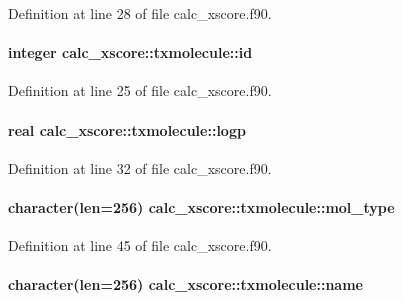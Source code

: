 Definition at line 28 of file calc\-\_\-xscore.\-f90.

\hypertarget{structcalc__xscore_1_1txmolecule_ad6611a3a5574439bc354eb21cdd75937}{
\paragraph[{id}]{\setlength{\rightskip}{0pt plus 5cm}integer calc\-\_\-xscore\-::txmolecule\-::id}}\label{structcalc__xscore_1_1txmolecule_ad6611a3a5574439bc354eb21cdd75937}


Definition at line 25 of file calc\-\_\-xscore.\-f90.

\hypertarget{structcalc__xscore_1_1txmolecule_a4e3e4aad711284f604eaf43234cc1409}{
\paragraph[{logp}]{\setlength{\rightskip}{0pt plus 5cm}real calc\-\_\-xscore\-::txmolecule\-::logp}}\label{structcalc__xscore_1_1txmolecule_a4e3e4aad711284f604eaf43234cc1409}


Definition at line 32 of file calc\-\_\-xscore.\-f90.

\hypertarget{structcalc__xscore_1_1txmolecule_a1dd0126a97ae9b645f38901a331f22ba}{
\paragraph[{mol\-\_\-type}]{\setlength{\rightskip}{0pt plus 5cm}character(len=256) calc\-\_\-xscore\-::txmolecule\-::mol\-\_\-type}}\label{structcalc__xscore_1_1txmolecule_a1dd0126a97ae9b645f38901a331f22ba}


Definition at line 45 of file calc\-\_\-xscore.\-f90.

\hypertarget{structcalc__xscore_1_1txmolecule_a500e61696ea7af4776ef9b97b0a6df4e}{
\paragraph[{name}]{\setlength{\rightskip}{0pt plus 5cm}character(len=256) calc\-\_\-xscore\-::txmolecule\-::name}}\label{structcalc__xscore_1_1txmolecule_a500e61696ea7af4776ef9b97b0a6df4e}


